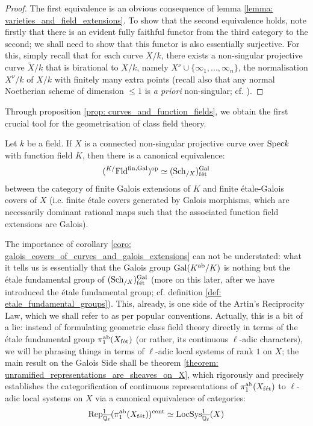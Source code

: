             \begin{proof}
                The first equivalence is an obvious consequence of lemma \ref{lemma: varieties_and_field_extensions}. To show that the second equivalence holds, note firstly that there is an evident fully faithful functor from the third category to the second; we shall need to show that this functor is also essentially surjective. For this, simply recall that for each curve $X/k$, there exists a non-singular projective curve $\tilde{X}/k$ that is birational to $X/k$, namely $X^{\nu} \cup \{\infty_1, ..., \infty_n\}$, the normalisation $X^{\nu}/k$ of $X/k$ with finitely many extra points (recall also that any normal Noetherian scheme of dimension $\leq 1$ is \textit{a priori} non-singular; cf. \cite[\href{https://stacks.math.columbia.edu/tag/0BX2}{Tag 0BX2}]{stacks}).
            \end{proof}
            
        Through proposition \ref{prop: curves_and_function_fields}, we obtain the first crucial tool for the geometrisation of class field theory.
        \begin{corollary} \label{coro: galois_covers_of_curves_and_galois_extensions}
            Let $k$ be a field. If $X$ is a connected non-singular projective curve over $\mathrm{Spec} k$ with function field $K$, then there is a canonical equivalence:
                $$({}^{K/}\mathrm{Fld}^{\mathrm{fin}, \mathrm{Gal}})^{\mathrm{op}} \simeq (\mathrm{Sch}_{/X})_{\mathrm{f\acute{e}t}}^{\mathrm{Gal}}$$
            between the category of finite Galois extensions of $K$ and finite \'etale-Galois covers of $X$ (i.e. finite \'etale covers generated by Galois morphisms, which are necessarily dominant rational maps such that the associated function field extensions are Galois). 
        \end{corollary}
        The importance of corollary \ref{coro: galois_covers_of_curves_and_galois_extensions} can not be understated: what it tells us is essentially that the Galois group $\mathrm{Gal}(K^{\mathrm{ab}}/K)$ is nothing but the \'etale fundamental group of $(\mathrm{Sch}_{/X})_{\mathrm{f\acute{e}t}}^{\mathrm{Gal}}$ (more on this later, after we have introduced the \'etale fundamental group; cf. definition \ref{def: etale_fundamental_groups}). This, already, is one side of the Artin's Reciprocity Law, which we shall refer to as  per popular conventions. Actually, this is a bit of a lie: instead of formulating geometric class field theory directly in terms of the \'etale fundamental group $\pi_1^{\mathrm{ab}}(X_{\mathrm{f\acute{e}t}})$ (or rather, its continuous $\ell$-adic characters), we will be phrasing things in terms of $\ell$-adic local systems of rank $1$ on $X$; the main result on the Galois Side shall be theorem \ref{theorem: unramified_representations_are_sheaves_on_X}, which rigorously and precisely establishes the categorification of continuous representations of $\pi_1^{\mathrm{ab}}(X_{\mathrm{f\acute{e}t}})$ to $\ell$-adic local systems on $X$ via a canonical equivalence of categories:
            $$\mathrm{Rep}^1_{\overline{\mathbb{Q}_{\ell}}}(\pi_1^{\mathrm{ab}}(X_{\mathrm{f\acute{e}t}}))^{\mathrm{cont}} \simeq \mathrm{LocSys}^1_{\overline{\mathbb{Q}_{\ell}}}(X)$$
    
